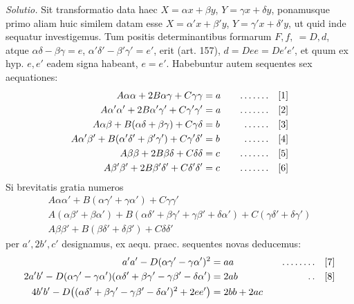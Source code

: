\textit{Solutio.} Sit transformatio data haec \(X=\alpha x+\beta y\), \(Y=\gamma x+\delta y\), ponamusque primo aliam huic similem datam esse \(X=\alpha'x+\beta'y\), \(Y=\gamma'x+\delta'y\), ut quid inde sequatur investigemus. Tum positis determinantibus formarum \(F,f,\ =D,d\), atque \(\alpha\delta-\beta\gamma=e\), \(\alpha'\delta'-\beta'\gamma'=e'\), erit (art. 157), \(d=Dee=De'e'\), et quum ex hyp. \(e,e'\) eadem signa habeant, \(e=e'\). Habebuntur autem sequentes sex aequationes:
\[
\begin{aligned}
A\alpha\alpha+2B\alpha\gamma+C\gamma\gamma&=a&\quad\mathinner{.\,.\,.\,.\,.\,.\,.}\quad&[1]\\
A\alpha'\alpha'+2B\alpha'\gamma'+C\gamma'\gamma'&=a&\quad\mathinner{.\,.\,.\,.\,.\,.\,.}\quad&[2]\\
A\alpha\beta+B(\alpha\delta+\beta\gamma)+C\gamma\delta&=b&\quad\mathinner{.\,.\,.\,.\,.\,.}\quad&[3]\\
A\alpha'\beta'+B(\alpha'\delta'+\beta'\gamma')+C\gamma'\delta'&=b&\quad\mathinner{.\,.\,.\,.\,.\,.}\quad&[4]\\
A\beta\beta+2B\beta\delta+C\delta\delta&=c&\quad\mathinner{.\,.\,.\,.\,.\,.\,.}\quad&[5]\\
A\beta'\beta'+2B\beta'\delta'+C\delta'\delta'&=c&\quad\mathinner{.\,.\,.\,.\,.\,.\,.}\quad&[6]
\end{aligned}
\]
Si brevitatis gratia numeros
\[
\begin{gathered}
A\alpha\alpha'+B(\alpha\gamma'+\gamma\alpha')+C\gamma\gamma'\\
A(\alpha\beta'+\beta\alpha')+B(\alpha\delta'+\beta\gamma'+\gamma\beta'+\delta\alpha')+C(\gamma\delta'+\delta\gamma')\\
A\beta\beta'+B(\beta\delta'+\delta\beta')+C\delta\delta'
\end{gathered}
\]
per \(a',2b',c'\) designamus, ex aequ. praec. sequentes novas deducemus:
\[
\begin{aligned}
a'a'-D(\alpha\gamma'-\gamma\alpha')^2&=aa&\quad\mathinner{.\,.\,.\,.\,.\,.\,.\,.}\quad&[7]\\
2a'b'-D(\alpha\gamma'-\gamma\alpha')(\alpha\delta'+\beta\gamma'-\gamma\beta'-\delta\alpha')&=2ab&\quad\mathinner{.\,.}\quad&[8]\\
4b'b'-D\bigl((\alpha\delta'+\beta\gamma'-\gamma\beta'-\delta\alpha')^2+2ee'\bigr)&=2bb+2ac
\end{aligned}
\]
